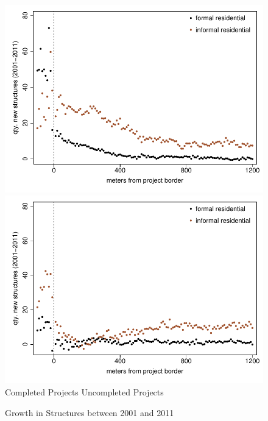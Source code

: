 \documentclass[12pt]{article}
\begin{document}
\begin{figure}
\caption{Growth in Structures between 2001 and 2011}\label{figure:buildingchanges}
\centering
\includegraphics[scale=.58]{figures/bbluplot.pdf}
\includegraphics[scale=.58]{figures/bbluplot_placebo.pdf}\\
\hspace{.7cm} Completed Projects \hspace{4.2cm} Uncompleted Projects
\end{figure}



\end{document}
